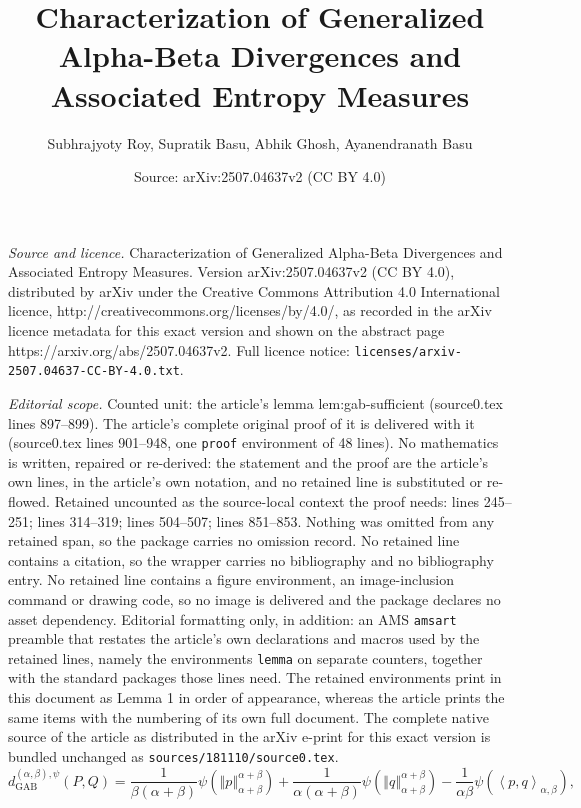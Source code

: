 \documentclass[10pt,a4paper]{amsart}
\title{Characterization of Generalized Alpha-Beta Divergences and Associated Entropy Measures}
\author{Subhrajyoty Roy, Supratik Basu, Abhik Ghosh, Ayanendranath Basu}
\date{Source: arXiv:2507.04637v2 (CC BY 4.0)}
\newcommand{\dGAB}{d_{\mathrm{GAB}}}
\newcommand{\inner}[1]{\left\langle #1\right\rangle}
\newcommand{\norm}[1]{\left\Vert #1 \right\Vert}
\begin{document}
\maketitle

\noindent\emph{Source and licence.} Characterization of Generalized Alpha-Beta Divergences and Associated Entropy Measures. Version arXiv:2507.04637v2 (CC BY 4.0), distributed by arXiv under the Creative Commons Attribution 4.0 International licence, http://creativecommons.org/licenses/by/4.0/, as recorded in the arXiv licence metadata for this exact version and shown on the abstract page https://arxiv.org/abs/2507.04637v2. Full licence notice: \texttt{licenses/arxiv-2507.04637-CC-BY-4.0.txt}.\par\smallskip

\noindent\textit{Editorial scope.} Counted unit: the article's lemma lem:gab-sufficient (source0.tex lines 897--899). The article's complete original proof of it is delivered with it (source0.tex lines 901--948, one \texttt{proof} environment of 48 lines). No mathematics is written, repaired or re-derived: the statement and the proof are the article's own lines, in the article's own notation, and no retained line is substituted or re-flowed.  Retained uncounted as the source-local context the proof needs: lines 245--251; lines 314--319; lines 504--507; lines 851--853.  Nothing was omitted from any retained span, so the package carries no omission record.  No retained line contains a citation, so the wrapper carries no bibliography and no bibliography entry.  No retained line contains a figure environment, an image-inclusion command or drawing code, so no image is delivered and the package declares no asset dependency.  Editorial formatting only, in addition: an AMS \texttt{amsart} preamble that restates the article's own declarations and macros used by the retained lines, namely the environments \texttt{lemma} on separate counters, together with the standard packages those lines need.  The retained environments print in this document as Lemma 1 in order of appearance, whereas the article prints the same items with the numbering of its own full document.  The complete native source of the article as distributed in the arXiv e-print for this exact version is bundled unchanged as \texttt{sources/181110/source0.tex}.
\begin{equation}
    \dGAB^{(\alpha,\beta),\psi}(P, Q)
    = \dfrac{1}{\beta(\alpha+\beta)} \psi\left( \norm{p}_{\alpha+\beta}^{\alpha+\beta} \right)
    + \dfrac{1}{\alpha(\alpha+\beta)} \psi\left( \norm{q}_{\alpha+\beta}^{\alpha+\beta} \right)
    - \dfrac{1}{\alpha\beta} \psi\left( \inner{p,q}_{\alpha,\beta} \right),
    \label{eqn:defn-gab-div}
\end{equation}
\end{document}
